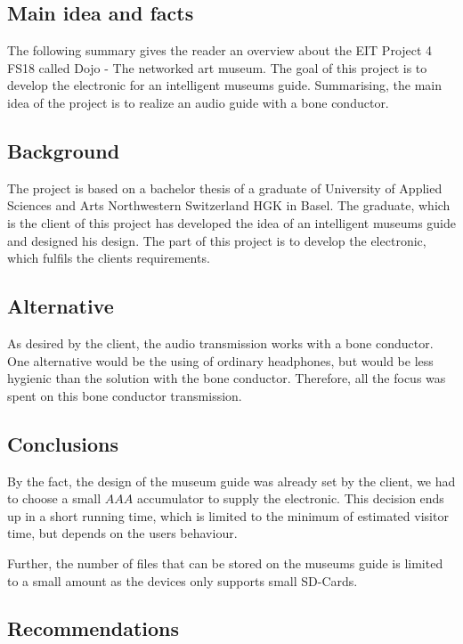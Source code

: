 \subsection*{Main idea and facts}

The following summary gives the reader an overview about the EIT Project 4 FS18 called Dojo - The networked art museum. The goal of this project is to develop the electronic for an intelligent museums guide. Summarising, the main idea of the project is to realize an audio guide with a bone conductor.

\subsection*{Background}

The project is based on a bachelor thesis of a graduate of University of Applied Sciences and Arts Northwestern Switzerland HGK in Basel. The graduate, which is the client of this project has developed the idea of an intelligent museums guide and designed his design. The part of this project is to develop the electronic, which fulfils the clients requirements.

\subsection*{Alternative}

As desired by the client, the audio transmission works with a bone conductor. One alternative would be the using of ordinary headphones, but would be less hygienic than the solution with the bone conductor. Therefore, all the focus was spent on this bone conductor transmission.

\subsection*{Conclusions}

By the fact, the design of the museum guide was already set by the client, we had to choose a small $AAA$ accumulator to supply the electronic. This decision ends up in a short running time, which is limited to the minimum of estimated visitor time, but depends on the users behaviour.

Further, the number of files that can be stored on the museums guide is limited to a small amount as the devices only supports small SD-Cards.

\subsection*{Recommendations}

